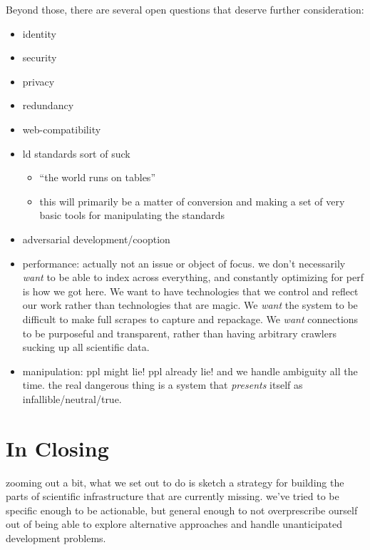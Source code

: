 Beyond those, there are several open questions that deserve further
consideration:

\begin{itemize}

\item
  identity
\item
  security
\item
  privacy
\item
  redundancy
\item
  web-compatibility
\item
  ld standards sort of suck

  \begin{itemize}
  
  \item
    ``the world runs on tables''
  \item
    this will primarily be a matter of conversion and making a set of
    very basic tools for manipulating the standards
  \end{itemize}
\item
  adversarial development/cooption
\item
  performance: actually not an issue or object of focus. we don't
  necessarily \emph{want} to be able to index across everything, and
  constantly optimizing for perf is how we got here. We want to have
  technologies that we control and reflect our work rather than
  technologies that are magic. We \emph{want} the system to be difficult
  to make full scrapes to capture and repackage. We \emph{want}
  connections to be purposeful and transparent, rather than having
  arbitrary crawlers sucking up all scientific data.
\item
  manipulation: ppl might lie! ppl already lie! and we handle ambiguity
  all the time. the real dangerous thing is a system that
  \emph{presents} itself as infallible/neutral/true.
\end{itemize}

\hypertarget{in-closing}{%
\section{In Closing}\label{in-closing}}

zooming out a bit, what we set out to do is sketch a strategy for
building the parts of scientific infrastructure that are currently
missing. we've tried to be specific enough to be actionable, but general
enough to not overprescribe ourself out of being able to explore
alternative approaches and handle unanticipated development problems.

